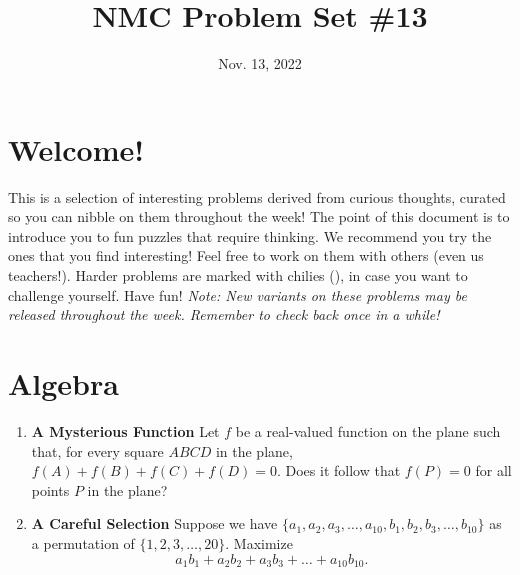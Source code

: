 \documentclass[11pt]{scrartcl}
\begin{document}
\title{NMC Problem Set \#13} %
\date{Nov. 13, 2022} %
\maketitle

\section*{Welcome!}

This is a selection of interesting problems derived from curious thoughts, curated so you can nibble on them throughout the week! The point of this document is to introduce you to fun puzzles that require thinking. We recommend you try the ones that you find interesting! Feel free to work on them with others (even us teachers!). Harder problems are marked with chilies (\fullchili), in case you want to challenge yourself.
\newline\newline
Have fun! \textit{Note: New variants on these problems may be released throughout the week. Remember to check back once in a while!}
    
\section{Algebra}
\begin{enumerate}[label=\textbf{A\arabic*}.]
    \item \textbf{A Mysterious Function} \newline
    Let $f$ be a real-valued function on the plane such that, for every square $ABCD$ in the plane, $f(A) + f(B) + f(C) + f(D) = 0$. Does it follow that $f(P) = 0$ for all points $P$ in the plane?
    
    \item \textbf{A Careful Selection} \newline
    Suppose we have $\{a_1, a_2, a_3, \dots, a_{10}, b_1, b_2, b_3, \dots, b_{10}\}$ as a permutation of $\{1, 2, 3, \dots, 20\}$. Maximize
    \[ a_1b_1 + a_2b_2 + a_3b_3 + \dots + a_{10}b_{10}. \]
    
\end{enumerate}

\newpage
\end{document}

